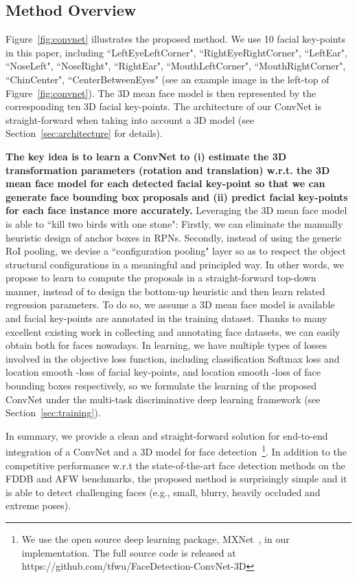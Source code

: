 \documentclass[runningheads]{llncs}
\begin{document}
\subsection{Method Overview}
Figure~\ref{fig:convnet} illustrates the proposed method. We use 10 facial key-points in this paper, including {``LeftEyeLeftCorner", ``RightEyeRightCorner",
    ``LeftEar", ``NoseLeft", ``NoseRight", ``RightEar",
    ``MouthLeftCorner",
    ``MouthRightCorner",
    ``ChinCenter",
    ``CenterBetweenEyes"} (see an example image in the left-top of Figure~\ref{fig:convnet}). The 3D mean face model is then represented by the corresponding ten 3D facial key-points. The architecture of our ConvNet is straight-forward when taking into account a 3D model (see Section~\ref{sec:architecture} for details).

 \textbf{The key idea is to learn a ConvNet to (i) estimate the 3D transformation parameters (rotation and translation) w.r.t. the 3D mean face model  for each detected facial key-point so that we can generate face bounding box proposals and (ii) predict facial key-points for each face instance more accurately.}  Leveraging the 3D mean face model is able to ``kill two birds with one stone": Firstly, we can eliminate the manually heuristic design of anchor boxes in RPNs. Secondly, instead of using the generic RoI pooling, we devise a ``configuration pooling" layer so as to respect the object structural configurations in a meaningful and principled way. In other words, we propose to learn to compute the proposals in a straight-forward top-down manner, instead of to design the bottom-up heuristic and then learn related regression parameters. To do so,  we assume a 3D mean face model is available and facial key-points are annotated in the training dataset. Thanks to  many excellent existing work in collecting and annotating face datasets, we can easily obtain both for faces nowadays.  In learning, we have multiple types of losses involved in the objective loss function, including classification Softmax loss and location smooth -loss \cite{FastRCNN} of facial key-points, and location smooth -loss of face bounding boxes respectively, so we formulate the learning of the proposed ConvNet under the multi-task discriminative deep learning framework (see Section~\ref{sec:training}).

In summary, we provide a clean and straight-forward solution for end-to-end integration of a ConvNet and a 3D model for face detection~\footnote{We use the open source deep learning package, MXNet~\cite{mxnet}, in our implementation. The full source code is released at https://github.com/tfwu/FaceDetection-ConvNet-3D}. In addition to the competitive performance w.r.t the state-of-the-art face detection methods on the FDDB and AFW benchmarks, the proposed method is surprisingly simple and it is able to detect challenging faces (e.g., small, blurry, heavily occluded and extreme poses).
\end{document}
